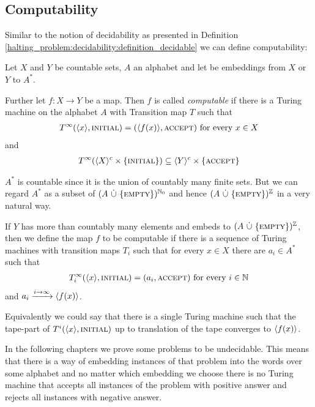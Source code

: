 \subsection{Computability}
\label{halting_problem:computability}

Similar to the notion of decidability as presented in Definition \ref{halting_problem:decidability:definition_decidable} we can define computability:

\begin{Definition}
	\label{halting_problem:computability:definition}
	Let $X$ and $Y$ be countable sets, $A$ an alphabet and let \emb{\cdot} be embeddings from $X$ or $Y$ to $A^*$.

	Further let $f:X \to Y$ be a map.
	Then $f$ is called \emph{computable} if there is a Turing machine on the alphabet $A$ with Transition map $T$ such that
	\begin{align*}
		T^\infty(\langle x \rangle,\text{\scshape{initial}}) = (\langle f(x) \rangle,\text{\scshape{accept}}) ~\text{for every}~ x \in X
	\end{align*}
	and
	\begin{align*}
		T^\infty(\langle X \rangle^c \times \{\text{\scshape{initial}}\}) \subseteq \langle Y \rangle^c \times \{\text{\scshape{accept}}\}
	\end{align*}
\end{Definition}

\begin{Remark}
	$A^*$ is countable since it is the union of countably many finite sets.
	But we can regard $A^*$ as a subset of $(A ~\dot\cup~ \{\text{\scshape{empty}}\})^{\mathbb{N}_0}$ and hence $(A ~\dot\cup~ \{\text{\scshape{empty}}\})^{\mathbb{Z}}$ in a very natural way.

	If $Y$ has more than countably many elements and embeds to $(A ~\dot\cup~ \{\text{\scshape{empty}}\})^{\mathbb{Z}}$, then we define the map $f$ to be computable if there is a sequence of Turing machines with transition maps $T_i$ such that for every $x \in X$ there are $a_i \in A^*$ such that
	\begin{align*}
		T_i^\infty(\langle x \rangle, \text{\scshape{initial}}) = (a_i,\text{\scshape{accept}}) ~\text{for every}~ i \in \mathbb{N}
	\end{align*}
	and $a_i \xrightarrow{i \to \infty} \langle f(x) \rangle$.

	Equivalently we could say that there is a single Turing machine such that the tape-part of $T^i(\langle x \rangle,\text{\scshape{initial}})$ up to translation of the tape converges to $\langle f(x) \rangle$.
\end{Remark}

In the following chapters we prove some problems to be undecidable.
This means that there is a way of embedding instances of that problem into the words over some alphabet and no matter which embedding we choose there is no Turing machine that accepts all instances of the problem with positive answer and rejects all instances with negative answer.

